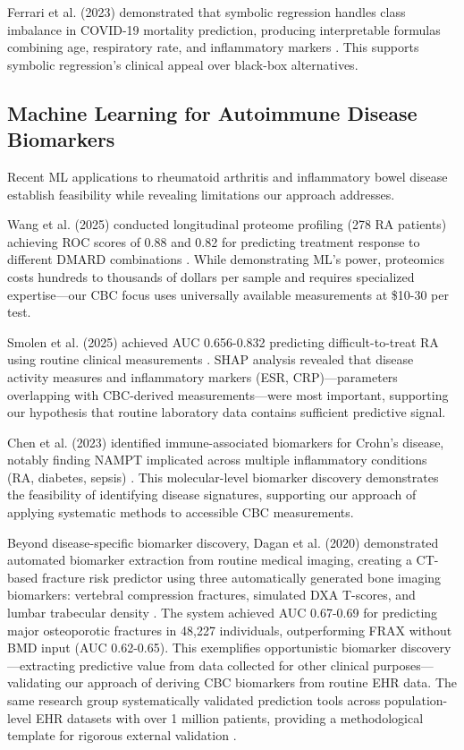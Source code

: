 \documentclass[12pt,a4paper]{article}
\begin{document}
Ferrari et al. (2023) demonstrated that symbolic regression handles class imbalance in COVID-19 mortality prediction, producing interpretable formulas combining age, respiratory rate, and inflammatory markers \cite{ref13}. This supports symbolic regression's clinical appeal over black-box alternatives.

\subsection{Machine Learning for Autoimmune Disease Biomarkers}

Recent ML applications to rheumatoid arthritis and inflammatory bowel disease establish feasibility while revealing limitations our approach addresses.

Wang et al. (2025) conducted longitudinal proteome profiling (278 RA patients) achieving ROC scores of 0.88 and 0.82 for predicting treatment response to different DMARD combinations \cite{ref14}. While demonstrating ML's power, proteomics costs hundreds to thousands of dollars per sample and requires specialized expertise---our CBC focus uses universally available measurements at \$10-30 per test.

Smolen et al. (2025) achieved AUC 0.656-0.832 predicting difficult-to-treat RA using routine clinical measurements \cite{ref15}. SHAP analysis revealed that disease activity measures and inflammatory markers (ESR, CRP)---parameters overlapping with CBC-derived measurements---were most important, supporting our hypothesis that routine laboratory data contains sufficient predictive signal.

Chen et al. (2023) identified immune-associated biomarkers for Crohn's disease, notably finding NAMPT implicated across multiple inflammatory conditions (RA, diabetes, sepsis) \cite{ref16}. This molecular-level biomarker discovery demonstrates the feasibility of identifying disease signatures, supporting our approach of applying systematic methods to accessible CBC measurements.

Beyond disease-specific biomarker discovery, Dagan et al. (2020) demonstrated automated biomarker extraction from routine medical imaging, creating a CT-based fracture risk predictor using three automatically generated bone imaging biomarkers: vertebral compression fractures, simulated DXA T-scores, and lumbar trabecular density \cite{ref29}. The system achieved AUC 0.67-0.69 for predicting major osteoporotic fractures in 48,227 individuals, outperforming FRAX without BMD input (AUC 0.62-0.65). This exemplifies opportunistic biomarker discovery---extracting predictive value from data collected for other clinical purposes---validating our approach of deriving CBC biomarkers from routine EHR data. The same research group systematically validated prediction tools across population-level EHR datasets with over 1 million patients, providing a methodological template for rigorous external validation \cite{ref30}.
\end{document}
